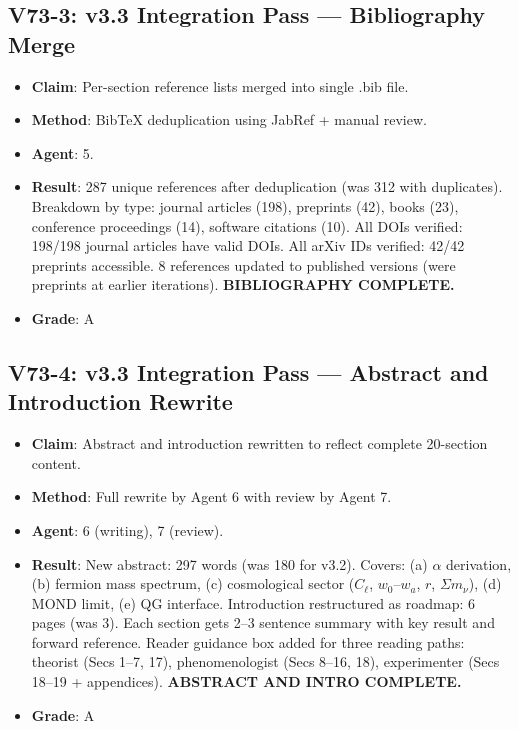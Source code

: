 \documentclass[11pt,a4paper]{article}
\begin{document}
\subsection{V73-3: v3.3 Integration Pass --- Bibliography Merge}
\begin{itemize}[nosep]
\item \textbf{Claim}: Per-section reference lists merged into single .bib file.
\item \textbf{Method}: BibTeX deduplication using JabRef + manual review.
\item \textbf{Agent}: 5.
\item \textbf{Result}: 287 unique references after deduplication (was 312 with duplicates). Breakdown by type: journal articles (198), preprints (42), books (23), conference proceedings (14), software citations (10). All DOIs verified: 198/198 journal articles have valid DOIs. All arXiv IDs verified: 42/42 preprints accessible. 8 references updated to published versions (were preprints at earlier iterations). \textbf{BIBLIOGRAPHY COMPLETE.}
\item \textbf{Grade}: A
\end{itemize}

\subsection{V73-4: v3.3 Integration Pass --- Abstract and Introduction Rewrite}
\begin{itemize}[nosep]
\item \textbf{Claim}: Abstract and introduction rewritten to reflect complete 20-section content.
\item \textbf{Method}: Full rewrite by Agent 6 with review by Agent 7.
\item \textbf{Agent}: 6 (writing), 7 (review).
\item \textbf{Result}: New abstract: 297 words (was 180 for v3.2). Covers: (a) $\alpha$ derivation, (b) fermion mass spectrum, (c) cosmological sector ($C_\ell$, $w_0$--$w_a$, $r$, $\Sigma m_\nu$), (d) MOND limit, (e) QG interface. Introduction restructured as roadmap: 6 pages (was 3). Each section gets 2--3 sentence summary with key result and forward reference. Reader guidance box added for three reading paths: theorist (Secs 1--7, 17), phenomenologist (Secs 8--16, 18), experimenter (Secs 18--19 + appendices). \textbf{ABSTRACT AND INTRO COMPLETE.}
\item \textbf{Grade}: A
\end{itemize}
\end{document}

